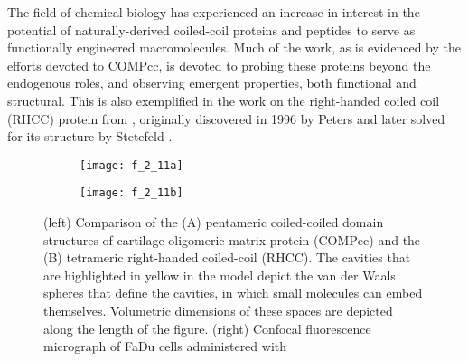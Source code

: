 \begin{refsection}
The field of chemical biology has experienced an increase in interest in the
potential of naturally-derived coiled-coil proteins and peptides to serve as
functionally engineered macromolecules. Much of the work, as is evidenced by the
efforts devoted to COMPcc, is devoted to probing these proteins
beyond the endogenous roles, and observing emergent properties, both functional
and structural. This is also exemplified in the work on the right-handed coiled
coil (RHCC) protein from , originally discovered
in 1996 by Peters  and later solved for its structure by Stetefeld
.\cite{Peters1996,Stetefeld2000} 
\begin{figure}[h!]
    \centering
    \begin{subfigure}[b]{0.45\textwidth}
        \texttt{[image: f\_2\_11a]}
        \label{fig:coil_comparison}
    \end{subfigure}
    \begin{subfigure}[b]{0.45\textwidth}
        \texttt{[image: f\_2\_11b]}
        \label{fig:coil_localization}
    \end{subfigure}
    \caption[(left) Comparison of the (A) pentameric coiled-coiled domain
        structures of cartilage oligomeric matrix protein (COMP) and the
        (B) tetrameric right-handed coiled-coil (RHCC). The cavities that are
        highlighted in yellow in the model depict the van der Waals spheres that
        define the cavities, in which small molecules can embed themselves.
        Volumetric dimensions of these spaces are depicted along the length of
        the figure.
        (right) Confocal fluorescence micrograph of FaDu cells administered with
        RHCC, conjugated to Alexa Fluor 488 SDP, after incubation or 8 h at
        \SI{37}{\celsius}, collected by Eriksson. Blue channel assigned to
        DAPI-staining of nuclear DNA. Green channel assigned to dye-conjugated
        RHCC.]{(left) Comparison of the (A) pentameric coiled-coiled domain
        structures of cartilage oligomeric matrix protein (COMPcc) and the
        (B) tetrameric right-handed coiled-coil (RHCC). The cavities that are
        highlighted in yellow in the model depict the van der Waals spheres that
        define the cavities, in which small molecules can embed themselves.
        Volumetric dimensions of these spaces are depicted along the length of
        the figure.\cite{McFarlane2009}
        (right) Confocal fluorescence micrograph of FaDu cells administered with
}
\end{figure}
\end{refsection}
